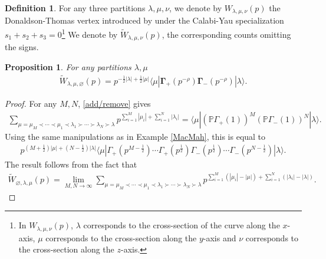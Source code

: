 \documentclass{amsart}
\newtheorem{proposition}[theorem]{Proposition}
\theoremstyle{definition}
\newtheorem{definition}[theorem]{Definition}
\newcommand{\PP} {\mathbb{P}}
\newcommand{\PT}{\mathrm{PT}}
\begin{document}
\begin{definition}
For any three partitions $\lambda, \mu, \nu$, we denote by $W_{\lambda,\mu,\nu}(p)$ the Donaldson-Thomas vertex introduced by \cite{MNOP1} 
under the Calabi-Yau specialization $s_1+s_2+s_3=0$\footnote{In $W_{\lambda,\mu,\nu}(p)$, $\lambda$ corresponds to the cross-section of the curve along the $x$-axis, $\mu$ corresponds to the cross-section along the $y$-axis and $\nu$ corresponds to the cross-section along the $z$-axis.} 
We denote by $\tilde{W}_{\lambda,\mu,\nu}(p)$, 
the corresponding counts omitting the signs.
\end{definition}

\begin{proposition} \label{2legs}
For any partitions $\lambda, \mu$
\begin{align*}
\tilde{W}_{\lambda,\mu,\varnothing}(p) = p^{-\frac{1}{2} |\lambda| + \frac{1}{2} |\mu|} \langle \mu | \mathbf{\Gamma}_+(p^{-\rho}) \mathbf{\Gamma}_-(p^{-\rho}) | \lambda \rangle.
\end{align*}
\end{proposition}
\begin{proof}
For any $M,N$, \eqref{add/remove} gives
\begin{align*}
\sum_{\mu = \mu_M \prec \cdots \prec \mu_1 \prec \lambda_1 \succ \cdots \succ \lambda_N \succ \lambda} p^{\sum_{i=1}^{M} |\mu_i| + \sum_{i=1}^{N} |\lambda_i|} = \langle \mu | (\PP \Gamma_+(1))^M (\PP \Gamma_-(1))^N | \lambda \rangle.
\end{align*}
Using the same manipulations as in Example \ref{MacMah}, this is equal to
\begin{align*}
p^{(M+\frac{1}{2})|\mu|+(N-\frac{1}{2})|\lambda|} \langle \mu | \Gamma_+(p^{M - \frac{1}{2}}) \cdots \Gamma_+(p^{\frac{1}{2}}) \Gamma_-(p^{\frac{1}{2}}) \cdots \Gamma_-(p^{N - \frac{1}{2}}) | \lambda \rangle.
\end{align*}
The result follows from the fact that
\begin{align*}
\tilde{W}_{\varnothing,\lambda,\mu}(p) = \lim_{M,N \rightarrow \infty} \sum_{\mu = \mu_M \prec \cdots \prec \mu_1 \prec \lambda_1 \succ \cdots \succ \lambda_N \succ \lambda} p^{\sum_{i=1}^{M} (|\mu_i|-|\mu|) + \sum_{i=1}^{N} (|\lambda_i|-|\lambda|)}.
\end{align*}
\end{proof}
\end{document}
